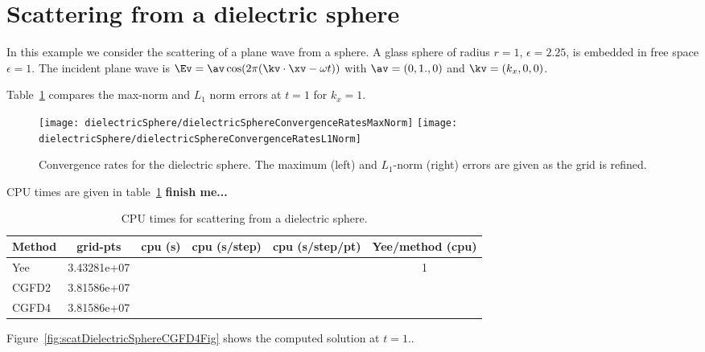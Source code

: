 \documentclass[11pt]{article}
\begin{document}
\clearpage
\section{Scattering from a dielectric sphere}\label{sec:dielectricSphere}

In this example we consider the scattering of a plane wave from a
sphere.
A glass sphere of radius $r=1$, $\epsilon=2.25$, is embedded in free space $\epsilon=1$. 
The incident plane wave is $\Ev = \av \cos(2\pi(\kv\cdot\xv - \omega t) )$ with
$\av=( 0, 1., 0)$ and $\kv=(k_x,0,0)$.

Table~\ref{fig:dielectricSphereConvergenceRatesMaxNorm} compares the max-norm and $L_1$ norm errors
at $t=1$ for $k_x=1$. 

\begin{figure}[hbt]
\begin{center}\small
\texttt{[image: dielectricSphere/dielectricSphereConvergenceRatesMaxNorm]}
\texttt{[image: dielectricSphere/dielectricSphereConvergenceRatesL1Norm]}
%
\caption{Convergence rates for the dielectric sphere.
  The maximum (left) and $L_1$-norm (right) errors are given as the grid is refined. }
\label{fig:dielectricSphereConvergenceRatesMaxNorm}
\end{center}
\end{figure}

CPU times are given in table~\ref{tab:dielectricSphereCPU} {\bf finish me...}

\begin{table}[hbt]
\begin{center}
\begin{tabular}{|l|c|c|c|c|c|}\hline
Method  & grid-pts  & cpu (s)      & cpu (s/step) & cpu (s/step/pt) &  Yee/method (cpu) \\ \hline
Yee     &  3.43281e+07    &              &              &               &     1    \\
CGFD2   &  3.81586e+07    &              &              &               &           \\
CGFD4   &  3.81586e+07    &              &              &               &          \\ \hline
\end{tabular}
\end{center}
\caption{ CPU times for scattering from a dielectric sphere.}\label{tab:dielectricSphereCPU}
\end{table}

Figure~\ref{fig:scatDielectricSphereCGFD4Fig} shows the computed solution at $t=1.$.





\clearpage


\end{document}
